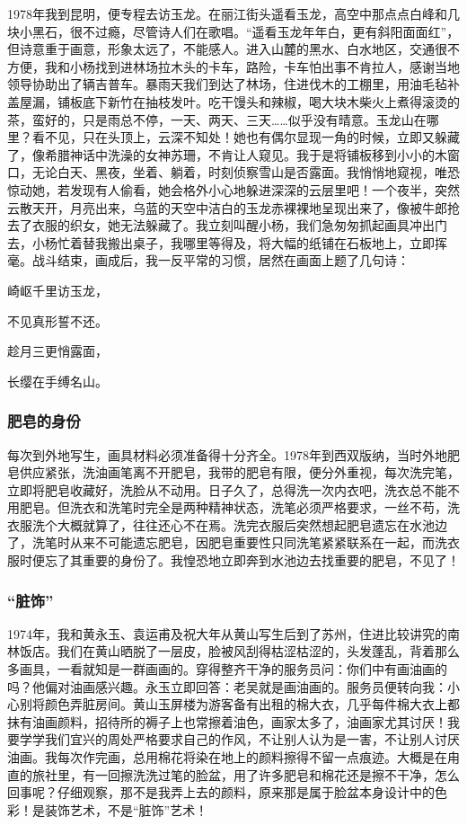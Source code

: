 \documentclass{article}
\begin{document}
1978年我到昆明，便专程去访玉龙。在丽江街头遥看玉龙，高空中那点点白峰和几块小黑石，很不过瘾，尽管诗人们在歌唱。“遥看玉龙年年白，更有斜阳面面红”，但诗意重于画意，形象太远了，不能感人。进入山麓的黑水、白水地区，交通很不方便，我和小杨找到进林场拉木头的卡车，路险，卡车怕出事不肯拉人，感谢当地领导协助出了辆吉普车。暴雨天我们到达了林场，住进伐木的工棚里，用油毛毡补盖屋漏，铺板底下新竹在抽枝发叶。吃干馒头和辣椒，喝大块木柴火上煮得滚烫的茶，蛮好的，只是雨总不停，一天、两天、三天……似乎没有晴意。玉龙山在哪里？看不见，只在头顶上，云深不知处！她也有偶尔显现一角的时候，立即又躲藏了，像希腊神话中洗澡的女神苏珊，不肯让人窥见。我于是将铺板移到小小的木窗口，无论白天、黑夜，坐着、躺着，时刻侦察雪山是否露面。我悄悄地窥视，唯恐惊动她，若发现有人偷看，她会格外小心地躲进深深的云层里吧！一个夜半，突然云散天开，月亮出来，乌蓝的天空中洁白的玉龙赤裸裸地呈现出来了，像被牛郎抢去了衣服的织女，她无法躲藏了。我立刻叫醒小杨，我们急匆匆抓起画具冲出门去，小杨忙着替我搬出桌子，我哪里等得及，将大幅的纸铺在石板地上，立即挥毫。战斗结束，画成后，我一反平常的习惯，居然在画面上题了几句诗：

崎岖千里访玉龙，

不见真形誓不还。

趁月三更悄露面，

长缨在手缚名山。
\subsubsection{肥皂的身份}
每次到外地写生，画具材料必须准备得十分齐全。1978年到西双版纳，当时外地肥皂供应紧张，洗油画笔离不开肥皂，我带的肥皂有限，便分外重视，每次洗完笔，立即将肥皂收藏好，洗脸从不动用。日子久了，总得洗一次内衣吧，洗衣总不能不用肥皂。但洗衣和洗笔时完全是两种精神状态，洗笔必须严格要求，一丝不苟，洗衣服洗个大概就算了，往往还心不在焉。洗完衣服后突然想起肥皂遗忘在水池边了，洗笔时从来不可能遗忘肥皂，因肥皂重要性只同洗笔紧紧联系在一起，而洗衣服时便忘了其重要的身份了。我惶恐地立即奔到水池边去找重要的肥皂，不见了！
\subsubsection{“脏饰”}
1974年，我和黄永玉、袁运甫及祝大年从黄山写生后到了苏州，住进比较讲究的南林饭店。我们在黄山晒脱了一层皮，脸被风刮得枯涩枯涩的，头发蓬乱，背着那么多画具，一看就知是一群画画的。穿得整齐干净的服务员问：你们中有画油画的吗？他偏对油画感兴趣。永玉立即回答：老吴就是画油画的。服务员便转向我：小心别将颜色弄脏房间。黄山玉屏楼为游客备有出租的棉大衣，几乎每件棉大衣上都抹有油画颜料，招待所的褥子上也常擦着油色，画家太多了，油画家尤其讨厌！我要学学我们宜兴的周处严格要求自己的作风，不让别人认为是一害，不让别人讨厌油画。我每次作完画，总用棉花将染在地上的颜料擦得不留一点痕迹。大概是在甪直的旅社里，有一回擦洗洗过笔的脸盆，用了许多肥皂和棉花还是擦不干净，怎么回事呢？仔细观察，那不是我弄上去的颜料，原来那是属于脸盆本身设计中的色彩！是装饰艺术，不是“脏饰”艺术！
\end{document}
